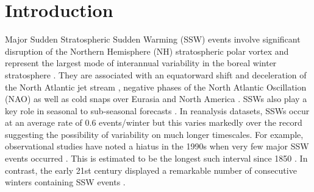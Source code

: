 \documentclass[wcd, manuscript]{copernicus}
\begin{document}

%
%
%
%

\newpage

\section{Introduction}

Major Sudden Stratospheric Sudden Warming (SSW) events involve significant disruption of the Northern Hemisphere (NH) stratospheric polar vortex and represent the largest mode of interannual variability in the boreal winter stratosphere \citep{Butler2017,baldwin2020}. They are associated with an equatorward shift and deceleration of the North Atlantic jet stream \citep{Kidston2015}, negative phases of the North Atlantic Oscillation (NAO) \citep{Baldwin_harbingers} as well as cold snaps over Eurasia and North America \citep{Thompson2002,Lehtonen,Tomassini2012,Kretschmer2018}. SSWs also play a key role in seasonal to sub-seasonal forecasts \citep{Domeison2019-1, Domeison2019-2}. In reanalysis datasets, SSWs occur at an average rate of 0.6 events/winter but this varies markedly over the record \citep{Butler2015} suggesting the possibility of variability on much longer timescales. For example, observational studies have noted a hiatus in the 1990s when very few major SSW events occurred \citep{Butler2015,Pawson1999,Shindell1999}. This is estimated to be the longest such interval since 1850 \citep{Domeison2019_hiatus}. In contrast, the early 21st century displayed a remarkable number of consecutive winters containing SSW events \citep{Manney2005}. 
\end{document}
